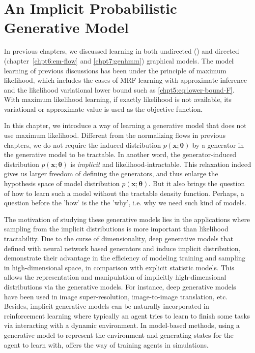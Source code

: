 \chapter{An Implicit Probabilistic Generative Model}
\label{chapter8}
\graphicspath{{source/chapter8/}}
In previous chapters, we discussed learning in both undirected (\label{chpt5:undirecteLearning}) and directed (chapter~\ref{chpt6:em-flow} and \ref{chpt7:genhmm}) graphical models. The model learning of previous discussions has been under the principle of maximum likelihood, which includes the cases of MRF learning with approximate inference and the likelihood variational lower bound such as \eqref{chpt5:eq:lower-bound-F}. With maximum likelihood learning, if exactly likelihood is not available, its variational or approximate value is used as the objective function.

In this chapter, we introduce a way of learning a generative model that does not use maximum likelihood. Different from the normalizing flows in previous chapters, we do not require the induced distribution $p(\bm{x};\bm{\theta})$ by a generator in the generative model to be tractable. In another word, the generator-induced distribution $p(\bm{x};\bm{\theta})$ is \textit{implicit} and likelihood-intractable. This relaxation indeed gives us larger freedom of defining the generators, and thus enlarge the hypothesis space of model distribution $p(\bm{x};\bm{\theta})$. But it also brings the question of how to learn such a model without the tractable density function. Perhaps, a question before the 'how' is the the 'why', i.e. why we need such kind of models.

The motivation of studying these generative models lies in the applications where sampling from the implicit distributions is more important than likelihood tractability. Due to the curse of dimensionality, deep generative models that defined with neural network based generators and induce implicit distribution, demonstrate their advantage in the efficiency of modeling training and sampling in high-dimensional space, in comparison with explicit statistic models. This allows the representation and manipulation of implicitly high-dimensional distributions via the generative models. For instance, deep generative models have been used in image super-resolution, image-to-image translation, etc. Besides, implicit generative models can be naturally incorporated in reinforcement learning where typically an agent tries to learn to finish some tasks via interacting with a dynamic environment. In model-based methods, using a generative model to represent the environment and generating states for the agent to learn with, offers the way of training agents in simulations.

